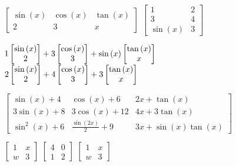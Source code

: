 \documentclass{article}
\begin{document}
\vspace{2.0cm}
$\left[\begin{matrix}\sin{\left(x \right)} & \cos{\left(x \right)} & \tan{\left(x \right)}\\2 & 3 & x\end{matrix}\right]$
$\left[\begin{matrix}1 & 2\\3 & 4\\\sin{\left(x \right)} & 3\end{matrix}\right]$

\vspace{0.5cm}
$1\left[\begin{matrix}\sin{\left(x \right)}\\2\end{matrix}\right]+3\left[\begin{matrix}\cos{\left(x \right)}\\3\end{matrix}\right]+\sin{\left(x \right)}\left[\begin{matrix}\tan{\left(x \right)}\\x\end{matrix}\right]\hspace{0.5cm}$
$2\left[\begin{matrix}\sin{\left(x \right)}\\2\end{matrix}\right]+4\left[\begin{matrix}\cos{\left(x \right)}\\3\end{matrix}\right]+3\left[\begin{matrix}\tan{\left(x \right)}\\x\end{matrix}\right]\hspace{0.5cm}$
\vspace{0.5cm}

$\left[\begin{matrix}\sin{\left(x \right)} + 4 & \cos{\left(x \right)} + 6 & 2 x + \tan{\left(x \right)}\\3 \sin{\left(x \right)} + 8 & 3 \cos{\left(x \right)} + 12 & 4 x + 3 \tan{\left(x \right)}\\\sin^{2}{\left(x \right)} + 6 & \frac{\sin{\left(2 x \right)}}{2} + 9 & 3 x + \sin{\left(x \right)} \tan{\left(x \right)}\end{matrix}\right]$
\vspace{2.0cm}

$\left[\begin{matrix}1 & x\\w & 3\end{matrix}\right]$
$\left[\begin{matrix}4 & 0\\1 & 2\end{matrix}\right]$
$\left[\begin{matrix}1 & x\\w & 3\end{matrix}\right]$
\end{document}
